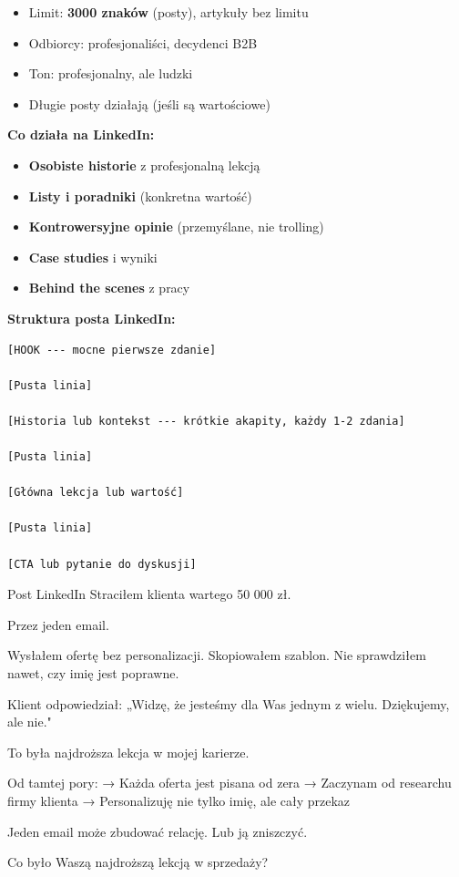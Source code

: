 \documentclass[
  12pt,
  a4paper,
  twoside,
  openright,
  12pt,
  DIV=12,
  BCOR=12mm]{scrbook}
\providecommand{\tightlist}{%
  \setlength{\itemsep}{0pt}\setlength{\parskip}{0pt}}\usepackage{longtable,booktabs,array}
\begin{document}
\begin{itemize}
\tightlist
\item
  Limit: \textbf{3000 znaków} (posty), artykuły bez limitu
\item
  Odbiorcy: profesjonaliści, decydenci B2B
\item
  Ton: profesjonalny, ale ludzki
\item
  Długie posty działają (jeśli są wartościowe)
\end{itemize}

\textbf{Co działa na LinkedIn:}

\begin{itemize}
\tightlist
\item
  \textbf{Osobiste historie} z profesjonalną lekcją
\item
  \textbf{Listy i poradniki} (konkretna wartość)
\item
  \textbf{Kontrowersyjne opinie} (przemyślane, nie trolling)
\item
  \textbf{Case studies} i wyniki
\item
  \textbf{Behind the scenes} z pracy
\end{itemize}

\textbf{Struktura posta LinkedIn:}

\begin{verbatim}
[HOOK --- mocne pierwsze zdanie]

[Pusta linia]

[Historia lub kontekst --- krótkie akapity, każdy 1-2 zdania]

[Pusta linia]

[Główna lekcja lub wartość]

[Pusta linia]

[CTA lub pytanie do dyskusji]
\end{verbatim}

\begin{przyklad}{Post LinkedIn}
Straciłem klienta wartego 50 000 zł.

Przez jeden email.

Wysłałem ofertę bez personalizacji. Skopiowałem szablon. Nie sprawdziłem nawet, czy imię jest poprawne.

Klient odpowiedział: „Widzę, że jesteśmy dla Was jednym z wielu. Dziękujemy, ale nie."

To była najdroższa lekcja w mojej karierze.

Od tamtej pory:
→ Każda oferta jest pisana od zera
→ Zaczynam od researchu firmy klienta
→ Personalizuję nie tylko imię, ale cały przekaz

Jeden email może zbudować relację.
Lub ją zniszczyć.

Co było Waszą najdroższą lekcją w sprzedaży?
\end{przyklad}
\end{document}
